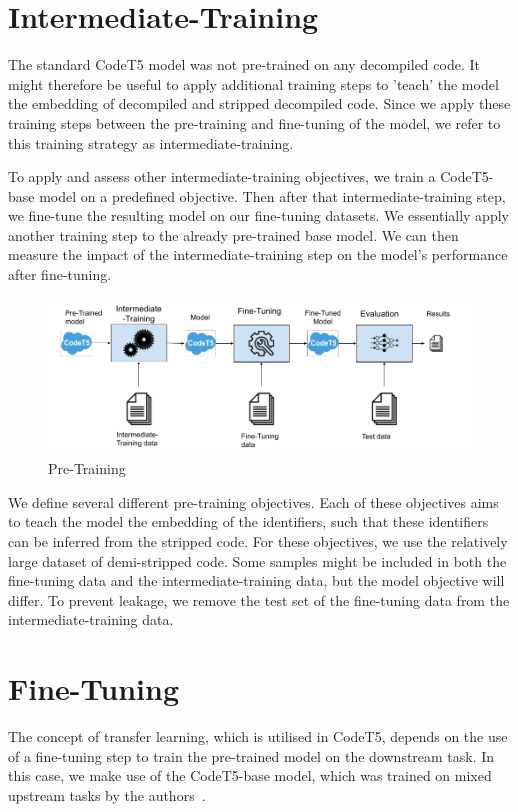 \section{Intermediate-Training}
The standard CodeT5 model was not pre-trained on any decompiled code. It might therefore be useful to apply additional training steps to 'teach' the model the embedding of decompiled and stripped decompiled code. Since we apply these training steps between the pre-training and fine-tuning of the model, we refer to this training strategy as intermediate-training.

To apply and assess other intermediate-training objectives, we train a CodeT5-base model on a predefined objective. Then after that intermediate-training step, we fine-tune the resulting model on our fine-tuning datasets. We essentially apply another training step to the already pre-trained base model. We can then measure the impact of the intermediate-training step on the model's performance after fine-tuning.

\begin{figure}[tbh]
  \centering
  \includegraphics[width=\linewidth]{img/pre-training.png}
  \caption{Pre-Training}
  \label{fig:preTraining}
\end{figure}

We define several different pre-training objectives. Each of these objectives aims to teach the model the embedding of the identifiers, such that these identifiers can be inferred from the stripped code. For these objectives, we use the relatively large dataset of demi-stripped code. Some samples might be included in both the fine-tuning data and the intermediate-training data, but the model objective will differ. To prevent leakage, we remove the test set of the fine-tuning data from the intermediate-training data. 

\section{Fine-Tuning}
The concept of transfer learning, which is utilised in CodeT5, depends on the use of a fine-tuning step to train the pre-trained model on the downstream task. In this case, we make use of the CodeT5-base model, which was trained on mixed upstream tasks by the authors~\cite{CodeT5}.

